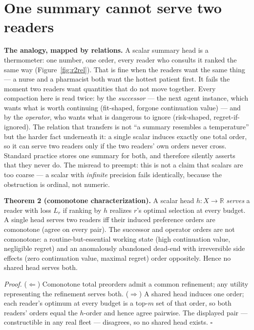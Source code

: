 \documentclass[11pt,a4paper]{article}
\begin{document}
\section{One summary cannot serve two readers}\label{sec:split}
\textbf{The analogy, mapped by relations.} A scalar summary head is a thermometer: one number, one order, every reader who consults it ranked the same way (Figure~\ref{fig:r2rel}). That is fine when the readers want the same thing --- a nurse and a pharmacist both want the hottest patient first. It fails the moment two readers want quantities that do not move together. Every compaction here is read twice: by the \emph{successor} --- the next agent instance, which wants what is worth continuing (fit-shaped, forgone continuation value) --- and by the \emph{operator}, who wants what is dangerous to ignore (risk-shaped, regret-if-ignored). The relation that transfers is not ``a summary resembles a temperature'' but the harder fact underneath it: a single scalar induces exactly one total order, so it can serve two readers only if the two readers' own orders never cross. Standard practice stores one summary for both, and therefore silently asserts that they never do. The misread to preempt: this is not a claim that scalars are too coarse --- a scalar with \emph{infinite} precision fails identically, because the obstruction is ordinal, not numeric.



\begin{thebox}
\textbf{Theorem 2 (comonotone characterization).} A scalar head $h:X\to\mathbb R$ \emph{serves} a reader with loss $L_r$ if ranking by $h$ realizes $r$'s optimal selection at every budget. A single head serves two readers iff their induced preference orders are comonotone (agree on every pair). The successor and operator orders are not comonotone: a routine-but-essential working state (high continuation value, negligible regret) and an anomalously abandoned dead-end with irreversible side effects (zero continuation value, maximal regret) order oppositely. Hence no shared head serves both.

\emph{Proof.} ($\Leftarrow$) Comonotone total preorders admit a common refinement; any utility representing the refinement serves both. ($\Rightarrow$) A shared head induces one order; each reader's optimum at every budget is a top-$m$ set of that order, so both readers' orders equal the $h$-order and hence agree pairwise. The displayed pair --- constructible in any real fleet --- disagrees, so no shared head exists. $\square$
\end{thebox}
\end{document}
